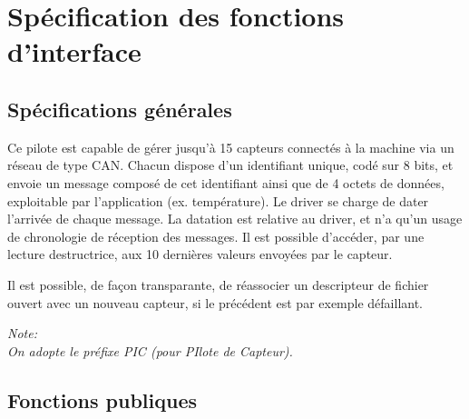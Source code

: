 

\section{Spécification des fonctions d'interface}

\subsection{Spécifications générales}

Ce pilote est capable de gérer jusqu'à 15 capteurs connectés à la 
machine via un réseau de type CAN. Chacun dispose d'un identifiant
unique, codé sur 8 bits, et envoie un message composé de cet
identifiant ainsi que de 4 octets de données, exploitable par
l'application (ex. température).
Le driver se charge de dater l'arrivée de chaque message.
La datation est relative au driver, et n'a qu'un usage
de chronologie de réception des messages.
Il est possible d'accéder, par une lecture destructrice, aux
10 dernières valeurs envoyées par le capteur.

Il est possible, de façon transparante, de réassocier un descripteur
de fichier ouvert avec un nouveau capteur, si le précédent est 
par exemple défaillant.

\textsl{
Note:\\
On adopte le préfixe PIC (pour PIlote de Capteur).
}


\subsection{Fonctions publiques}

